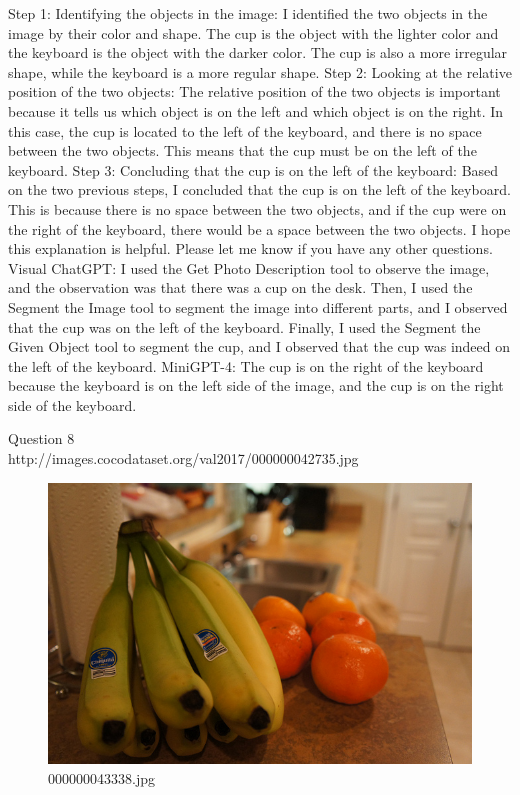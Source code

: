 \begin{enumerate}
        Step 1: Identifying the objects in the image: I identified the two objects in the image by their color and shape. The cup is the object with the lighter color and the keyboard is the object with the darker color. The cup is also a more irregular shape, while the keyboard is a more regular shape.
        Step 2: Looking at the relative position of the two objects: The relative position of the two objects is important because it tells us which object is on the left and which object is on the right. In this case, the cup is located to the left of the keyboard, and there is no space between the two objects. This means that the cup must be on the left of the keyboard.
        Step 3: Concluding that the cup is on the left of the keyboard: Based on the two previous steps, I concluded that the cup is on the left of the keyboard. This is because there is no space between the two objects, and if the cup were on the right of the keyboard, there would be a space between the two objects.
        I hope this explanation is helpful. Please let me know if you have any other questions.
        \subitem Visual ChatGPT: I used the Get Photo Description tool to observe the image, and the observation was that there was a cup on the desk. Then, I used the Segment the Image tool to segment the image into different parts, and I observed that the cup was on the left of the keyboard. Finally, I used the Segment the Given Object tool to segment the cup, and I observed that the cup was indeed on the left of the keyboard.
        \subitem MiniGPT-4: The cup is on the right of the keyboard because the keyboard is on the left side of the image, and the cup is on the right side of the keyboard.
    \end{enumerate}
Question 8\\
http://images.cocodataset.org/val2017/000000042735.jpg
    \begin{figure}[h]
        \centering
        \includegraphics[width=0.8\linewidth]{../image set/easy/000000043338.jpg}
        \caption{000000043338.jpg}
    \end{figure}
